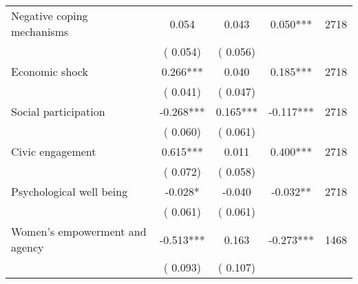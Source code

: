 \begin{tabular}{l*{4}{c}}
 Negative coping mechanisms &              0.054 &         0.043 &           0.050*** & 2718                       \\  
                 &        (       0.054)                   &        (       0.056)                        &                                                             &                                                      \\      

 Economic shock &              0.266*** &         0.040 &           0.185*** & 2718                       \\  
                 &        (       0.041)                   &        (       0.047)                        &                                                             &                                                      \\      

 Social participation &             -0.268*** &         0.165*** &          -0.117*** & 2718                       \\  
                 &        (       0.060)                   &        (       0.061)                        &                                                             &                                                      \\      

 Civic engagement &              0.615*** &         0.011 &           0.400*** & 2718                       \\  
                 &        (       0.072)                   &        (       0.058)                        &                                                             &                                                      \\      

 Psychological well being &             -0.028* &        -0.040 &          -0.032** & 2718                       \\  
                 &        (       0.061)                   &        (       0.061)                        &                                                             &                                                      \\      

 Women's empowerment and agency &             -0.513*** &         0.163 &          -0.273*** & 1468                       \\  
                 &        (       0.093)                   &        (       0.107)                        &                                                             &                                                      \\      


\end{tabular}
